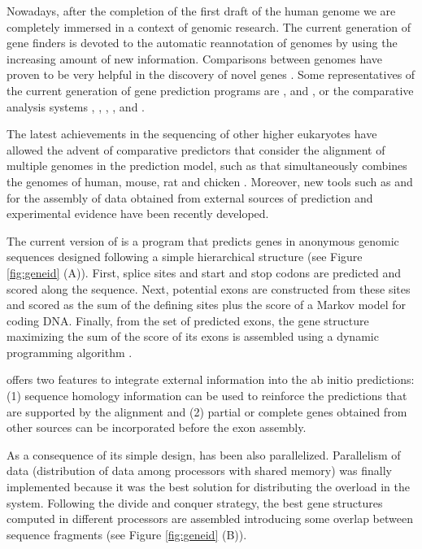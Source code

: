 Nowadays, after the completion of the first draft of the human genome 
we are completely immersed in a context of genomic research. The current generation 
of gene finders is devoted to the automatic reannotation of genomes by using the increasing 
amount of new information. Comparisons between genomes have proven to be very 
helpful in the discovery of novel genes \citep{guigo:2003a}. Some representatives
of the current generation of gene prediction programs are  
\citep{salamov:2000a},  \citep{blanco:2003a} and  
\citep{yeh:2001a}, or the comparative analysis systems  \citep{meyer:2002a}, 
 \citep{batzoglou:2000a},  \citep{alexandersson:2003a}, 
 \citep{wiehe:2001a},  \citep{parra:2003a} 
and  \citep{korf:2001a}. 

The latest achievements in the sequencing of other higher eukaryotes have allowed the advent 
of comparative predictors that consider the alignment of multiple genomes in the prediction model, 
such as  that simultaneously combines the genomes of human, mouse, rat and 
chicken \citep{gross:2005a}. Moreover, new tools such as  \citep{allen:2005a} and 
 \citep{howe:2002a} for the assembly of data obtained from 
external sources of prediction and experimental evidence have been recently 
developed. 


The current version of  \citep{blanco:2003a} is a program that predicts genes in anonymous 
genomic sequences designed following a simple hierarchical structure (see Figure \ref{fig:geneid} (A)). 
First, splice sites and start and stop codons are predicted and scored along the sequence. 
Next, potential exons are constructed from these sites and scored as the sum 
of the defining sites plus the score of a Markov model for coding DNA. Finally, 
from the set of predicted exons, the gene structure maximizing the sum of the 
score of its exons is assembled using a dynamic programming algorithm \citep{guigo:1998a}.

 offers two features to integrate external information into the ab initio predictions: 
(1) sequence homology information can be used to reinforce the predictions that are supported by the 
alignment and (2) partial or complete genes obtained from other sources can be incorporated before 
the exon assembly.

As a consequence of its simple design,  has been also parallelized.
Parallelism of data (distribution of data among processors with shared memory) was 
finally implemented because it was the best solution for distributing the
overload in the system. Following the divide and conquer strategy, the best gene 
structures computed in different processors are assembled introducing 
some overlap between sequence fragments (see Figure \ref{fig:geneid} (B)).

